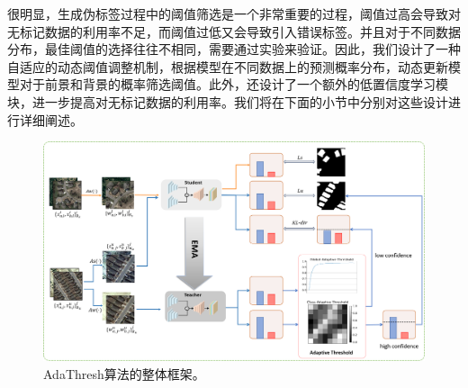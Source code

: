 \documentclass[lang=chs, degree=master, blindreview=false, adobe=false]{yanputhesis}
\begin{document}
很明显，生成伪标签过程中的阈值筛选是一个非常重要的过程，阈值过高会导致对无标记数据的利用率不足，而阈值过低又会导致引入错误标签。并且对于不同数据分布，最佳阈值的选择往往不相同，需要通过实验来验证。因此，我们设计了一种自适应的动态阈值调整机制，根据模型在不同数据上的预测概率分布，动态更新模型对于前景和背景的概率筛选阈值。此外，还设计了一个额外的低置信度学习模块，进一步提高对无标记数据的利用率。我们将在下面的小节中分别对这些设计进行详细阐述。
\begin{figure}[htb]
	\centering
	\includegraphics[scale=0.35]{images/AdaThFrame.png}
	\caption{
		AdaThresh算法的整体框架。
	}
	\label{fig:AdaTh_frame}
\end{figure}
\end{document}
